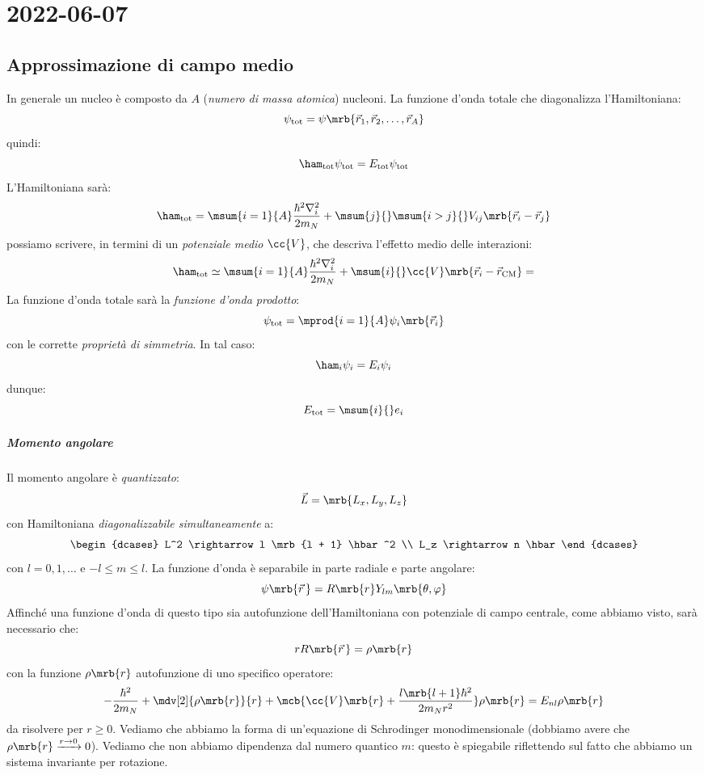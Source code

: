 \chapter{2022-06-07}
\section{Approssimazione di campo medio}
In generale un nucleo è composto da $A$ (\textit{numero di massa atomica})
nucleoni. La funzione d'onda totale che diagonalizza l'Hamiltoniana:
\[
  \psi _\text{tot} = \psi \mrb{\vec{r}_{1}, \vec{r}_{2}, \dots, \vec{r}_{A}}
\]
quindi:
\[
  \ham _\text{tot} \psi _\text{tot} = E _\text{tot} \psi _\text{tot}
\]
L'Hamiltoniana sarà:
\[
  \ham _\text{tot} = \msum{i=1}{A} \frac{\hbar^2 \nabla^2_i}{2m_N} + \msum{j}{}
  \msum{i > j}{} V _{ij} \mrb{\vec{r}_{i} - \vec{r}_{j}}
\]
possiamo scrivere, in termini di un \textit{potenziale medio} $\cc{V}$, che
descriva l'effetto medio delle interazioni:
\[
  \ham _\text{tot} \simeq \msum{i=1}{A} \frac{\hbar^2 \nabla^2_i}{2m_N} +
  \msum{i}{} \cc{V}\mrb{\vec{r}_{i} - \vec{r}_\text{CM}} =  %
\]
La funzione d'onda totale sarà la \textit{funzione d'onda prodotto}:
\[
  \psi _\text{tot} = \mprod{i=1}{A} \psi _{i} \mrb{\vec{r}_{i}}
\]
con le corrette \textit{proprietà di simmetria}. In tal caso:
\[
  \ham_i \psi_i = E_i \psi_i
\]
dunque:
\[
  E _\text{tot} = \msum{i}{} e_i
\]

\paragraph{Momento angolare}
Il momento angolare è \textit{quantizzato}:
\[
  \vec{L} = \mrb{L_x, L_y, L_z}
\]
con Hamiltoniana \textit{diagonalizzabile simultaneamente} a:
\[
  \begin{dcases}
    L^2 \rightarrow l \mrb{l + 1} \hbar^2
    \\
    L_z \rightarrow n \hbar
  \end{dcases}
\]
con $l = 0, 1, \dots$ e $-l \leq m \leq l$.
La funzione d'onda è separabile in parte radiale e parte angolare:
\[
  \psi \mrb{\vec{r}\,} = R \mrb{r} Y _{lm} \mrb{\theta, \varphi}
\]
Affinché una funzione d'onda di questo tipo sia autofunzione dell'Hamiltoniana
con potenziale di campo centrale, come abbiamo visto, sarà necessario che:
\[
  r R \mrb{\vec{r}\,} = \rho \mrb{r}
\]
con la funzione $\rho \mrb{r}$ autofunzione di uno specifico operatore:
\[
  - \frac{\hbar^2}{2m_N} + \mdv[2]{\rho \mrb{r}}{r} + \mcb{\cc{V} \mrb{r} +
  \frac{l \mrb{l + 1} \hbar^2}{2m_N r^2}} \rho \mrb{r} = E _{nl} \rho \mrb{r}
\]
da risolvere per $r \geq 0$. Vediamo che abbiamo la forma di un'equazione di
Schrodinger monodimensionale (dobbiamo avere che $\rho \mrb{r}
\xrightarrow{r\to 0} 0$).
Vediamo che non abbiamo dipendenza dal numero quantico $m$: questo è spiegabile
riflettendo sul fatto che abbiamo un sistema invariante per rotazione.

